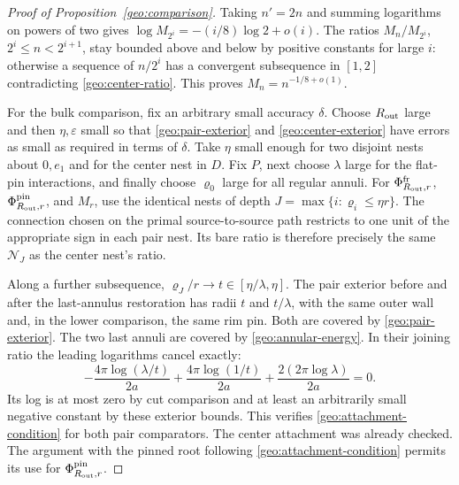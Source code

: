 \begin{proof}[Proof of Proposition~\ref{geo:comparison}]
Taking \(n'=2n\) and summing logarithms on powers of two gives
\(\log M_{2^i}=-(i/8)\log2+o(i)\).  The ratios
\(M_n/M_{2^i}\), \(2^i\le n<2^{i+1}\), stay bounded above and below
by positive constants for large \(i\): otherwise a sequence of
\(n/2^i\) has a convergent subsequence in \([1,2]\) contradicting
\eqref{geo:center-ratio}.  This proves \(M_n=n^{-1/8+o(1)}\).

For the bulk comparison, fix an arbitrary small accuracy \(\delta\).
Choose \(R_{\rm out}\) large and then \(\eta,\varepsilon\) small so that
\eqref{geo:pair-exterior} and \eqref{geo:center-exterior} have errors
as small as required in terms of \(\delta\).  Take \(\eta\) small
enough for two disjoint nests about \(0,e_1\) and for the center nest
in \(D\).  Fix \(P\), next choose \(\lambda\) large for the flat-pin
interactions, and finally choose \(\varrho_0\) large for all regular
annuli.  For \(\Phi_{R_{\rm out},r}^{\rm fr}\),
\(\Phi_{R_{\rm out},r}^{\rm pin}\), and \(M_r\), use the identical nests of depth
\(J=\max\{i:\varrho_i\le\eta r\}\).  The connection chosen on the
primal source-to-source path restricts to one unit of the appropriate
sign in each pair nest.  Its bare ratio is therefore precisely the
same \(\mathcal N_J\) as the center nest's ratio.

Along a further subsequence, \(\varrho_J/r\to t\in
[\eta/\lambda,\eta]\).  The pair exterior before and after the
last-annulus restoration has radii \(t\) and \(t/\lambda\), with the
same outer wall and, in the lower comparison, the same rim pin.
Both are covered by \eqref{geo:pair-exterior}.  The two last annuli
are covered by \eqref{geo:annular-energy}.  In their joining ratio
the leading logarithms cancel exactly:
\[
 -\frac{4\pi\log(\lambda/t)}{2a}
 +\frac{4\pi\log(1/t)}{2a}
 +\frac{2(2\pi\log\lambda)}{2a}=0.
\]
Its log is at most zero by cut comparison and at least an arbitrarily
small negative constant by these exterior bounds.  This verifies
\eqref{geo:attachment-condition} for both pair comparators.  The
center attachment was already checked.  The argument with the pinned
root following \eqref{geo:attachment-condition} permits its use for
\(\Phi_{R_{\rm out},r}^{\rm pin}\).


\end{proof}
